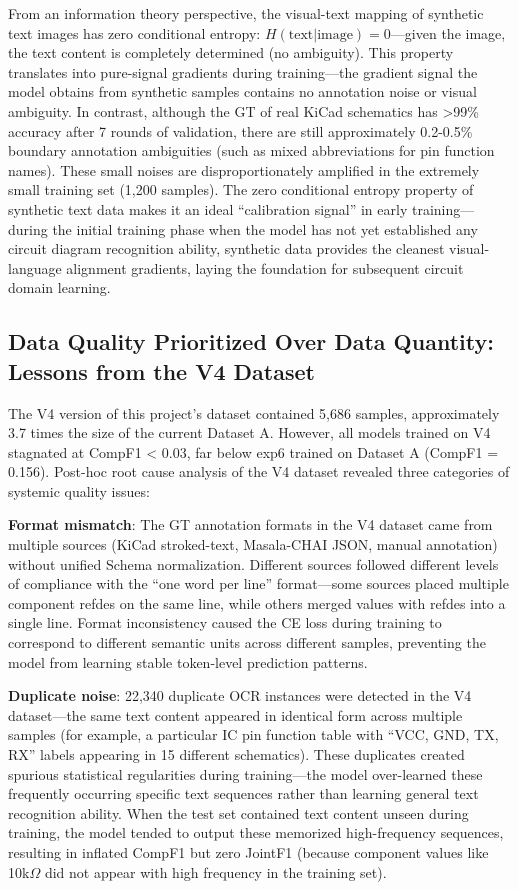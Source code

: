 From an information theory perspective, the visual-text mapping of synthetic text images has zero conditional entropy: $H(\text{text}|\text{image}) = 0$---given the image, the text content is completely determined (no ambiguity). This property translates into pure-signal gradients during training---the gradient signal the model obtains from synthetic samples contains no annotation noise or visual ambiguity. In contrast, although the GT of real KiCad schematics has >99\% accuracy after 7 rounds of validation, there are still approximately 0.2-0.5\% boundary annotation ambiguities (such as mixed abbreviations for pin function names). These small noises are disproportionately amplified in the extremely small training set (1,200 samples). The zero conditional entropy property of synthetic text data makes it an ideal ``calibration signal'' in early training---during the initial training phase when the model has not yet established any circuit diagram recognition ability, synthetic data provides the cleanest visual-language alignment gradients, laying the foundation for subsequent circuit domain learning.

\subsection{Data Quality Prioritized Over Data Quantity: Lessons from the V4 Dataset}

The V4 version of this project's dataset contained 5,686 samples, approximately 3.7 times the size of the current Dataset A. However, all models trained on V4 stagnated at CompF1 < 0.03, far below exp6 trained on Dataset A (CompF1 = 0.156). Post-hoc root cause analysis of the V4 dataset revealed three categories of systemic quality issues:

\textbf{Format mismatch}: The GT annotation formats in the V4 dataset came from multiple sources (KiCad stroked-text, Masala-CHAI JSON, manual annotation) without unified Schema normalization. Different sources followed different levels of compliance with the ``one word per line'' format---some sources placed multiple component refdes on the same line, while others merged values with refdes into a single line. Format inconsistency caused the CE loss during training to correspond to different semantic units across different samples, preventing the model from learning stable token-level prediction patterns.

\textbf{Duplicate noise}: 22,340 duplicate OCR instances were detected in the V4 dataset---the same text content appeared in identical form across multiple samples (for example, a particular IC pin function table with ``VCC, GND, TX, RX'' labels appearing in 15 different schematics). These duplicates created spurious statistical regularities during training---the model over-learned these frequently occurring specific text sequences rather than learning general text recognition ability. When the test set contained text content unseen during training, the model tended to output these memorized high-frequency sequences, resulting in inflated CompF1 but zero JointF1 (because component values like 10k$\Omega$ did not appear with high frequency in the training set).

